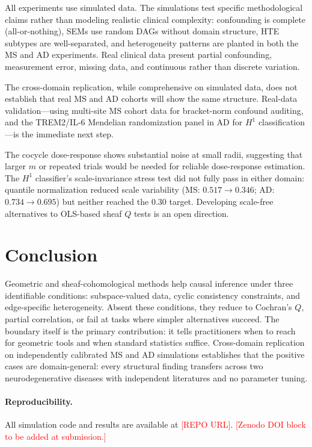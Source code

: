 \documentclass[11pt]{article}
\begin{document}
All experiments use simulated data.
The simulations test specific methodological claims rather than modeling realistic clinical complexity: confounding is complete (all-or-nothing), SEMs use random DAGs without domain structure, HTE subtypes are well-separated, and heterogeneity patterns are planted in both the MS and AD experiments.
Real clinical data present partial confounding, measurement error, missing data, and continuous rather than discrete variation.

The cross-domain replication, while comprehensive on simulated data, does not establish that real MS and AD cohorts will show the same structure.
Real-data validation---using multi-site MS cohort data for bracket-norm confound auditing, and the TREM2/IL-6 Mendelian randomization panel in AD for $H^1$ classification---is the immediate next step.

The cocycle dose-response shows substantial noise at small radii, suggesting that larger $m$ or repeated trials would be needed for reliable dose-response estimation.
The $H^1$ classifier's scale-invariance stress test did not fully pass in either domain: quantile normalization reduced scale variability (MS: $0.517 \to 0.346$; AD: $0.734 \to 0.695$) but neither reached the $0.30$ target.
Developing scale-free alternatives to OLS-based sheaf $Q$ tests is an open direction.

\section{Conclusion}
\label{sec:conclusion}

Geometric and sheaf-cohomological methods help causal inference under three identifiable conditions: subspace-valued data, cyclic consistency constraints, and edge-specific heterogeneity.
Absent these conditions, they reduce to Cochran's $Q$, partial correlation, or fail at tasks where simpler alternatives succeed.
The boundary itself is the primary contribution: it tells practitioners when to reach for geometric tools and when standard statistics suffice.
Cross-domain replication on independently calibrated MS and AD simulations establishes that the positive cases are domain-general: every structural finding transfers across two neurodegenerative diseases with independent literatures and no parameter tuning.

\paragraph{Reproducibility.}
All simulation code and results are available at \textcolor{red}{[REPO URL]}. \textcolor{red}{[Zenodo DOI block to be added at submission.]}


% 
\end{document}
